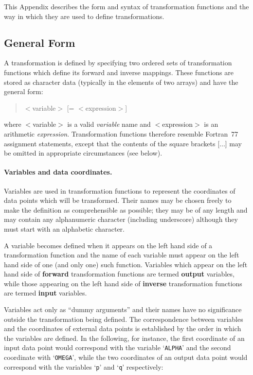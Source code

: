 This Appendix describes the form and syntax of transformation functions and
the way in which they are used to define transformations. 


\subsection{General Form}

A transformation is defined by specifying two ordered sets of transformation
functions which define its forward and inverse mappings. 
These functions are stored as character data (typically in the elements of
two  arrays) and have the general form: 

\begin{quote}
$<$variable$>$ [= $<$expression$>$]
\end{quote}

where \mbox{$<$variable$>$} is a valid {\em variable} name and
\mbox{$<$expression$>$} is an arithmetic {\em expression}. 
Transformation functions therefore resemble Fortran~77 assignment
statements, except that the contents of the square brackets \mbox{[...]} may
be omitted in appropriate circumstances (see below). 

\paragraph{Variables and data coordinates.}
Variables are used in transformation functions to represent the coordinates
of data points which will be transformed.
Their names may be chosen freely to make the definition as comprehensible as
possible; they may be of any length and may contain any alphanumeric
character (including underscore) although they must start with an alphabetic
character. 

A variable becomes defined when it appears on the left hand side of a
transformation function and the name of each variable must appear on the
left hand side of one (and only one) such function. 
Variables which appear on the left hand side of {\bf forward} transformation
functions are termed {\bf output} variables, while those appearing on the
left hand side of {\bf inverse} transformation functions are termed {\bf
input} variables. 

Variables act only as ``dummy arguments'' and their names have no
significance outside the transformation being defined. 
The correspondence between variables and the coordinates of external data
points is established by the order in which the variables are defined. 
In the following, for instance, the first coordinate of an input data point
would correspond with the variable `\verb#ALPHA#' and the second coordinate
with `\verb#OMEGA#', while the two coordinates of an output data point would
correspond with the variables `\verb#p#' and `\verb#q#' respectively: 

